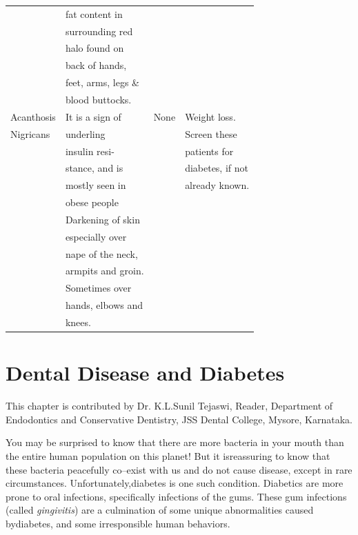 {\begin{longtable}{|l|l|l|l|}
 & fat content in &  & \\
 & surrounding red &  & \\
 & halo found on &  & \\
 & back of hands, &  & \\
 & feet, arms, legs \& &  & \\
 & blood buttocks. &  & \\
\hline
Acanthosis & It is a sign of & None & Weight loss.\\
Nigricans & underling &  & Screen these\\
 & insulin resi- &  & patients for\\
 & stance, and is &  & diabetes, if not\\
 & mostly seen in &  & already known.\\
 & obese people &  & \\
 & Darkening of skin &  & \\
 & especially over &  & \\
 & nape of the neck, &  & \\
 & armpits and groin. &  & \\
 & Sometimes over &  & \\
 & hands, elbows and &  & \\
 & knees. &  & \\
\hline
\end{longtable}
}\relax


\newpage
 
\setcounter{chapter}{17}
\renewcommand{\thechapter}{\arabic{chapter}B}
\chapter{Dental Disease and Diabetes}\label{chap18B}

This chapter is contributed by Dr. K.L.Sunil Tejaswi, Reader, Department of Endodontics and Conservative Dentistry, JSS Dental College, Mysore, Karnataka.

You may be surprised to know that there are more bacteria in your mouth than the entire human population on this planet! But it is\break reassuring to know that these bacteria peacefully co–exist with us and do not cause disease, except in rare circumstances. Unfortunately,\break diabetes is one such condition. Diabetics are more prone to oral infe\-ctions, specifically infections of the gums. These gum infections (called \textit{gingivitis}) are a culmination of some unique abnormalities caused by\break diabetes, and some irresponsible human behaviors.

